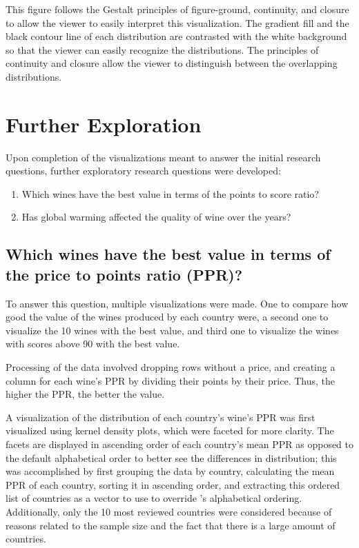 This figure follows the Gestalt principles of figure-ground, continuity, and closure to allow the viewer to easily interpret this visualization. The gradient fill and the black contour line of each distribution are contrasted with the white background so that the viewer can easily recognize the distributions. The principles of continuity and closure allow the viewer to distinguish between the overlapping distributions.


\section{Further Exploration}

Upon completion of the visualizations meant to answer the initial research questions, further exploratory research questions were developed:

\begin{enumerate}
  \item Which wines have the best value in terms of the points to score ratio? 
  \item Has global warming affected the quality of wine over the years?
\end{enumerate}

\subsection{Which wines have the best value in terms of the price to points ratio (PPR)?}

To answer this question, multiple visualizations were made. One to compare how good the value of the wines produced by each country were, a second one to visualize the 10 wines with the best value, and third one to visualize the wines with scores above 90 with the best value.

Processing of the data involved dropping rows without a price, and creating a column for each wine's PPR by dividing their points by their price. Thus, the higher the PPR, the better the value.

A visualization of the distribution of each country's wine's PPR was first visualized using kernel density plots, which were faceted for more clarity. The facets are displayed in ascending order of each country's mean PPR as opposed to the default alphabetical order to better see the differences in distribution; this was accomplished by first grouping the data by country, calculating the mean PPR of each country, sorting it in ascending order, and extracting this ordered list of countries as a vector to use to override 's alphabetical ordering. Additionally, only the 10 most reviewed countries were considered because of reasons related to the sample size and the fact that there is a large amount of countries.

